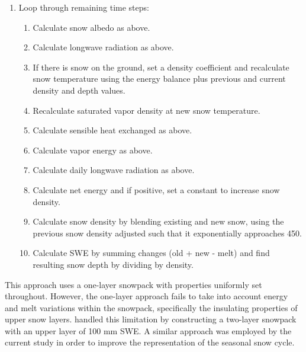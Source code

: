 \documentclass[12pt]{article}
\begin{document}
\begin{enumerate}
\begin{enumerate}
  \end{enumerate}
  \item Loop through remaining time steps:
  \begin{enumerate}
    \item Calculate snow albedo as above.
    \item Calculate longwave radiation as above.
    \item If there is snow on the ground, set a density coefficient and recalculate snow temperature using the energy balance plus previous and current density and depth values.
    \item Recalculate saturated vapor density at new snow temperature.
    \item Calculate sensible heat exchanged as above.
    \item Calculate vapor energy as above.
    \item Calculate daily longwave radiation as above.
    \item Calculate net energy and if positive, set a constant to increase snow density.
    \item Calculate snow density by blending existing and new snow, using the previous snow density adjusted such that it exponentially approaches 450.
    \item Calculate SWE by summing changes (old + new - melt) and find resulting snow depth by dividing by density.
  \end{enumerate}
\end{enumerate}

This approach uses a one-layer snowpack with properties uniformly set throughout.
However, the one-layer approach fails to take into account energy and melt variations within the snowpack, specifically the insulating properties of upper snow layers.
\citet{jost2012distributed} handled this limitation by constructing a two-layer snowpack with an upper layer of 100 mm SWE.
A similar approach was employed by the current study in order to improve the representation of the seasonal snow cycle.
\end{document}
